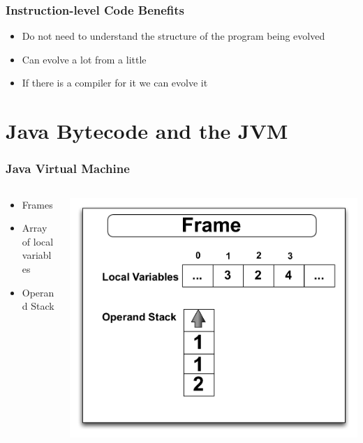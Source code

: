 \documentclass{beamer}
\begin{document}
\begin{frame}
	\frametitle{Instruction-level Code Benefits}
	\begin{itemize}
		\item Do not need to understand the structure of the program being evolved
		\item Can evolve a lot from a little
		\item If there is a compiler for it we can evolve it
	\end{itemize}		

\end{frame}


\section[Bytecode and Assembly]{Java Bytecode and the JVM}

\begin{frame}
	\frametitle{Java Virtual Machine}
\begin{columns}
\begin{column}{0.5\textwidth}
\begin{itemize}	
\item Frames
\item Array of local variables
\item Operand Stack
\end{itemize}
\end{column}
\begin{column}{0.5\textwidth}
\includegraphics[width=1\textwidth]{Illustrations/frame.pdf}
\end{column}
\end{columns}



\end{frame}
\end{document}
